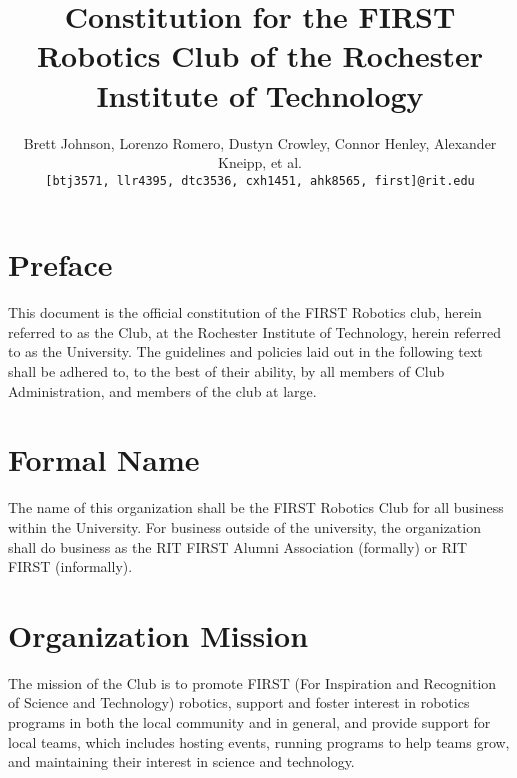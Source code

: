 \documentclass[english,11pt]{article}
\renewcommand{\footrulewidth}{1pt} %
\begin{document}
\title{Constitution for the FIRST Robotics Club of the Rochester Institute of Technology}
\author{
    Brett Johnson, Lorenzo Romero, Dustyn Crowley, Connor Henley, Alexander Kneipp, et al.  %
    \\
    \texttt{[btj3571, llr4395, dtc3536, cxh1451, ahk8565, first]@rit.edu}
}
\date{} %

\fancypagestyle{plain}{
    \fancyhf{}
    \rfoot{\today}
    \renewcommand{\footrulewidth}{0pt} %
}

\maketitle
\newpage %


\section*{Preface}
This document is the official constitution of the FIRST Robotics club, herein referred to as the Club, at the Rochester Institute of Technology, herein referred to as the University.
The guidelines and policies laid out in the following text shall be adhered to, to the best of their ability, by all members of Club Administration, and members of the club at large.

\section{Formal Name} \label{art:formal-name}
The name of this organization shall be the FIRST Robotics Club for all business within the University.
For business outside of the university, the organization shall do business as the RIT FIRST Alumni Association (formally) or RIT FIRST (informally).

\section{Organization Mission} \label{art:mission}
The mission of the Club is to promote FIRST (For Inspiration and Recognition of Science and Technology) robotics, support and foster interest in robotics programs in both the local community and in general, and provide support for local teams, which includes hosting events, running programs to help teams grow, and maintaining their interest in science and technology.
\end{document}

